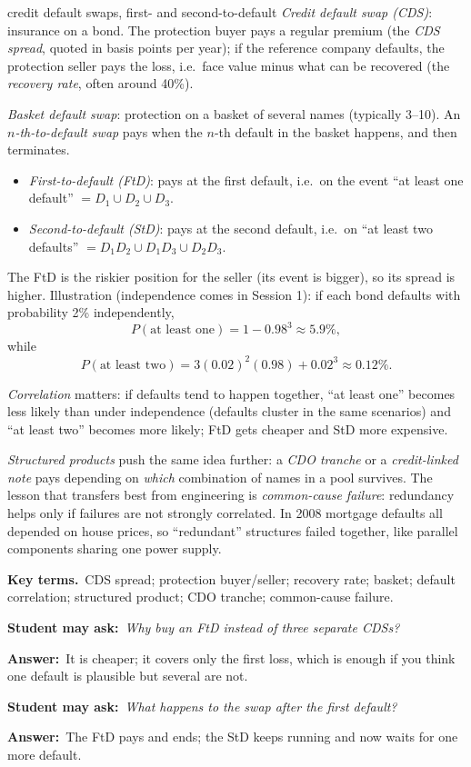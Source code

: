 \documentclass[11pt,a4paper,parskip=half]{scrartcl}
\newcommand{\terms}{\par\textbf{\color{plum}Key terms.}\ }
\newcommand{\sq}[1]{\par\textbf{\color{plum}Student may ask:}\ \emph{#1}\par}
\newcommand{\ans}{\textbf{Answer:}\ }
\begin{document}
\begin{bg}{credit default swaps, first- and second-to-default}
	\emph{Credit default swap (CDS)}: insurance on a bond. The protection
	buyer pays a regular premium (the \emph{CDS spread}, quoted in basis
	points per year); if the reference company defaults, the protection seller
	pays the loss, i.e.\ face value minus what can be recovered (the
	\emph{recovery rate}, often around 40\%).

	\emph{Basket default swap}: protection on a basket of several names
	(typically 3--10). An \emph{$n$-th-to-default swap} pays when the $n$-th
	default in the basket happens, and then terminates.
	\begin{itemize}[nosep]
		\item \emph{First-to-default (FtD)}: pays at the first default, i.e.\ on
		      the event ``at least one default'' $=D_1\cup D_2\cup D_3$.
		\item \emph{Second-to-default (StD)}: pays at the second default, i.e.\
		      on ``at least two defaults'' $=D_1D_2\cup D_1D_3\cup D_2D_3$.
	\end{itemize}
	The FtD is the riskier position for the seller (its event is bigger), so
	its spread is higher. Illustration (independence comes in Session 1): if
	each bond defaults with probability 2\% independently,
	\[ P(\text{at least one})=1-0.98^3\approx 5.9\%, \]
	while
	\[ P(\text{at least two})=3(0.02)^2(0.98)+0.02^3\approx 0.12\%. \]

	\emph{Correlation} matters: if defaults tend to happen together, ``at
	least one'' becomes less likely than under independence (defaults cluster
	in the same scenarios) and ``at least two'' becomes more likely; FtD gets
	cheaper and StD more expensive.

	\emph{Structured products} push the same idea further: a \emph{CDO
		tranche} or a \emph{credit-linked note} pays depending on \emph{which}
	combination of names in a pool survives. The lesson that transfers best
	from engineering is \emph{common-cause failure}: redundancy helps only if
	failures are not strongly correlated. In 2008 mortgage defaults all
	depended on house prices, so ``redundant'' structures failed together,
	like parallel components sharing one power supply.

	\terms CDS spread; protection buyer/seller; recovery rate; basket; default
	correlation; structured product; CDO tranche; common-cause failure.

	\sq{Why buy an FtD instead of three separate CDSs?}
	\ans It is cheaper; it covers only the first loss, which is enough if you
	think one default is plausible but several are not.

	\sq{What happens to the swap after the first default?}
	\ans The FtD pays and ends; the StD keeps running and now waits for one
	more default.
\end{bg}
\end{document}
